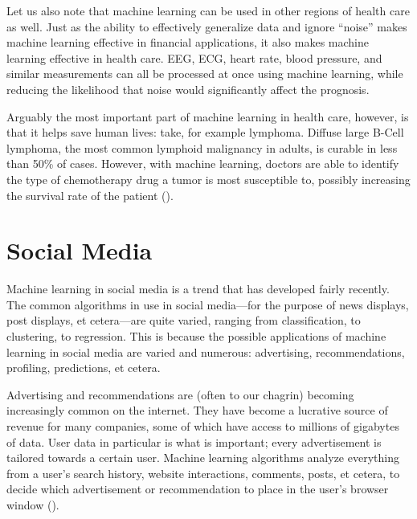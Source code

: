 \documentclass[a4paper]{comjnl}
\numberwithin{equation}{subsection}
\begin{document}
        Let us also note that machine learning can be used in other regions of health care as well.
        Just as the ability to effectively generalize data and ignore ``noise'' makes machine
        learning effective in financial applications, it also makes machine learning effective in
        health care. EEG, ECG, heart rate, blood pressure, and similar measurements can all be
        processed at once using machine learning, while reducing the likelihood that noise would
        significantly affect the prognosis.

        Arguably the most important part of machine learning in health care, however, is that it
        helps save human lives: take, for example lymphoma. Diffuse large B-Cell lymphoma, the most
        common lymphoid malignancy in adults, is curable in less than 50\% of cases. However, with
        machine learning, doctors are able to identify the type of chemotherapy drug a tumor is most
        susceptible to, possibly increasing the survival rate of the patient (\cite{shippm}).        


    \section{Social Media}

        Machine learning in social media is a trend that has developed fairly recently. The common
        algorithms in use in social media---for the purpose of news displays, post displays, et
        cetera---are quite varied, ranging from classification, to clustering, to regression.
        This is because the possible applications of machine learning in social media are varied
        and numerous: advertising, recommendations, profiling, predictions, et cetera. 

        Advertising and recommendations are (often to our chagrin) becoming increasingly common on
        the internet. They have become a lucrative source of revenue for many companies, some of
        which have access to millions of gigabytes of data. User data in particular is what is
        important; every advertisement is tailored towards a certain user. Machine learning
        algorithms analyze everything from a user's search history, website interactions, comments,
        posts, et cetera, to decide which advertisement or recommendation to place in the user's
        browser window (\cite{perlichc}).
\end{document}
